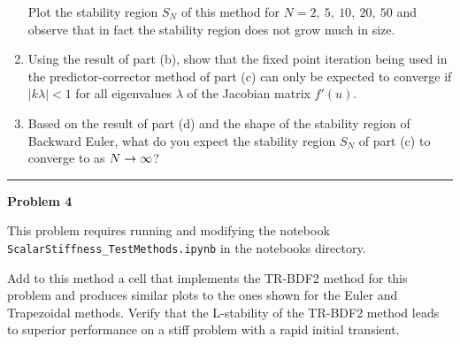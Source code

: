 \documentclass[10pt]{article}
\begin{document}
\begin{enumerate}
Plot the stability region $S_N$ of this method for $N=2,~5,~10,~20,~50$ 
and observe that in fact the stability region does not grow much in size.

\item Using the result of part (b), show that the fixed point iteration
being used in the predictor-corrector method of part (c) can only be
expected to converge if $|k\lambda| < 1$ for all eigenvalues $\lambda$ of
the
Jacobian matrix $f'(u)$.  

\item Based on the result of part (d) and the shape of the stability region
of Backward Euler, what do you expect the stability region $S_N$ of part (c)
to converge to as $N\rightarrow\infty$?

\end{enumerate}





\vskip 1cm
\hrule
{\bf Problem 4}

This problem requires running and modifying the notebook 
{\tt ScalarStiffness\_TestMethods.ipynb} in the notebooks directory.

Add to this method a cell that implements the TR-BDF2 method for this
problem and produces similar plots to the ones shown for the Euler and
Trapezoidal methods.  Verify that the L-stability of the TR-BDF2 method
leads to superior performance on a stiff problem with a rapid initial 
transient.




\end{document}

